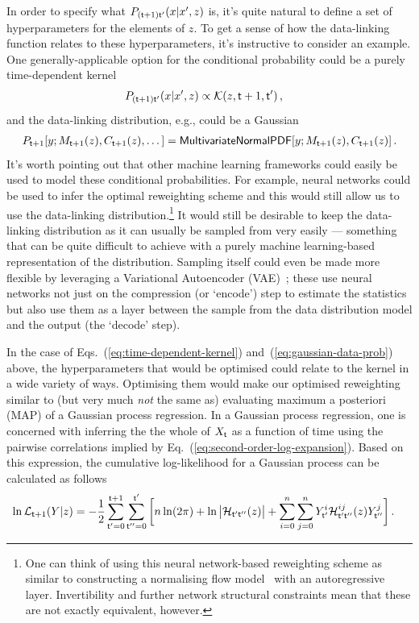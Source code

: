 In order to specify what $P_{({\sf t}+1){\sf t}'}(x\vert x',z)$ is, it's quite natural to define a set of hyperparameters for the elements of $z$. To get a sense of how the data-linking function relates to these hyperparameters, it's instructive to consider an example. One generally-applicable option for the conditional probability could be a purely time-dependent kernel
\begin{align}
P_{({\sf t}+1){\sf t}'}(x\vert x',z) &\propto {\cal K}(z, {\sf t}+1,{\sf t}')  \label{eq:time-dependent-kernel} \,, 
\end{align}
and the data-linking distribution, e.g., could be a Gaussian
\begin{align}
P_{{\sf t}+1}[y;M_{{\sf t}+1}(z),C_{{\sf t}+1}(z),\dots ] = {\sf MultivariateNormalPDF}[y;M_{{\sf t}+1}(z),C_{{\sf t}+1}(z)] \label{eq:gaussian-data-prob}\,.
\end{align}
It's worth pointing out that other machine learning frameworks could easily be used to model these conditional probabilities. For example, neural networks could be used to infer the optimal reweighting scheme and this would still allow us to use the data-linking distribution.\footnote{One can think of using this neural network-based reweighting scheme as similar to constructing a normalising flow model~\cite{kobyzev2020normalizing} with an autoregressive layer. Invertibility and further network structural constraints mean that these are not exactly equivalent, however.} It would still be desirable to keep the data-linking distribution as it can usually be sampled from very easily --- something that can be quite difficult to achieve with a purely machine learning-based representation of the distribution. Sampling itself could even be made more flexible by leveraging a Variational Autoencoder (VAE)~\cite{pinheiro2021variational}; these use neural networks not just on the compression (or `encode') step to estimate the statistics but also use them as a layer between the sample from the data distribution model and the output (the `decode' step).

In the case of Eqs.~(\ref{eq:time-dependent-kernel}) and~(\ref{eq:gaussian-data-prob}) above, the hyperparameters that would be optimised could relate to the kernel in a wide variety of ways. Optimising them would make our optimised reweighting similar to (but very much \emph{not} the same as) evaluating maximum a posteriori (MAP) of a Gaussian process regression. In a Gaussian process regression, one is concerned with inferring the the whole of $X_{{\sf t}}$ as a function of time using the pairwise correlations implied by Eq.~(\ref{eq:second-order-log-expansion}). Based on this expression, the cumulative log-likelihood for a Gaussian process can be calculated as follows
\begin{align}
\ln {\cal L}_{{\sf t}+1}(Y\vert z) &= -\frac{1}{2}\sum_{{\sf t}'=0}^{{\sf t}+1}\sum_{{\sf t}''=0}^{{\sf t}'} \bigg[ n\ln (2\pi ) + \ln \big\vert {\cal H}_{{\sf t}'{\sf t}''}(z)\big\vert + \sum_{i=0}^{n}\sum_{j=0}^{n} Y^i_{{\sf t}'} {\cal H}^{ij}_{{\sf t}'{\sf t}''}(z) Y^j_{{\sf t}''} \bigg] \,. \label{eq:log-likelihood-gaussian-proc}    
\end{align}

